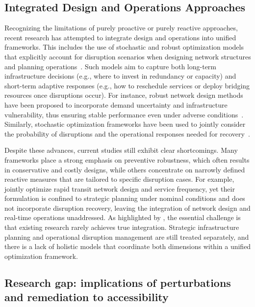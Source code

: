 \documentclass[3p,times,procedia]{elsarticle}
\begin{document}
\subsection{Integrated Design and Operations Approaches}\label{subsec:integrated}

Recognizing the limitations of purely proactive or purely reactive approaches, 
recent research has attempted to integrate design and operations into unified frameworks. 
This includes the use of stochastic and robust optimization models that explicitly account for disruption scenarios 
when designing network structures and planning operations~\citep{Cadarso2015,CadarsoMarin2014b}.
Such models aim to capture both long-term infrastructure decisions (e.g., where to invest in redundancy or capacity) 
and short-term adaptive responses (e.g., how to reschedule services or deploy bridging resources once disruptions occur). 
For instance, robust network design methods have been proposed to incorporate demand uncertainty and infrastructure vulnerability, 
thus ensuring stable performance even under adverse conditions~\citep{CadarsoMarin2014b,AnLo2016}. 
Similarly, stochastic optimization frameworks have been used to jointly consider the probability of disruptions 
and the operational responses needed for recovery~\citep{Cadarso2015}. 

Despite these advances, current studies still exhibit clear shortcomings. 
Many frameworks place a strong emphasis on preventive robustness, which often results in conservative and costly designs, 
while others concentrate on narrowly defined reactive measures that are tailored to specific disruption cases. 
For example, \citet{LopezRamos2017} jointly optimize rapid transit network design and service frequency, yet their formulation is confined to strategic planning under nominal conditions and does not incorporate disruption recovery, leaving the integration of network design and real-time operations unaddressed.
As highlighted by \citet{Besinovic2020,Lusby2018}, the essential challenge is that existing research rarely achieves true integration. 
Strategic infrastructure planning and operational disruption management are still treated separately, 
and there is a lack of holistic models that coordinate both dimensions within a unified optimization framework.

\subsection{Research gap: implications of perturbations and remediation to accessibility}\label{subsec:gap}
\end{document}
